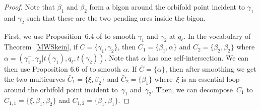 \documentclass[pdftex]{sigma}%
\numberwithin{equation}{section}
\begin{document}
\begin{proof}
Note that $\beta_1$ and $\beta_2$ form a bigon around the orbifold point incident to $\gamma_1$ and $\gamma_2$ such that these are the two pending arcs inside the bigon.

First, we use Proposition~6.4 of \cite{MW} to smooth $\gamma_1$ and $\gamma_2$ at $q_\ell$. In the vocabulary of Theorem~\ref{MWSkein}, if $C = \{\gamma_1, \gamma_2\}$, then $C_1 = \{\beta_1,\alpha\}$ and $C_2 = \{\beta_2,\beta_2\}$ where $\alpha = (\gamma_1^-, \gamma_2 \vert t(\gamma_1), q_\ell, t(\gamma_2))$. Note that $\alpha$ has one self-intersection. We can then use Proposition 6.6 of \cite{MW} to smooth $\alpha$. If $\bar{C} = \{\alpha\}$, then after smoothing we get the two multicurves $\bar{C}_1 = \{\xi, \beta_2\}$ and $\bar{C}_2 = \{\beta_1 \}$ where~$\xi$ is an essential loop around the orbifold point incident to~$\gamma_1$ and~$\gamma_2$. Then, we can decompose~$C_1$ to $C_{1,1} = \{\xi, \beta_1,\beta_2\}$ and $C_{1,2} = \{\beta_1,\beta_1\}$.


\end{proof}
\end{document}
